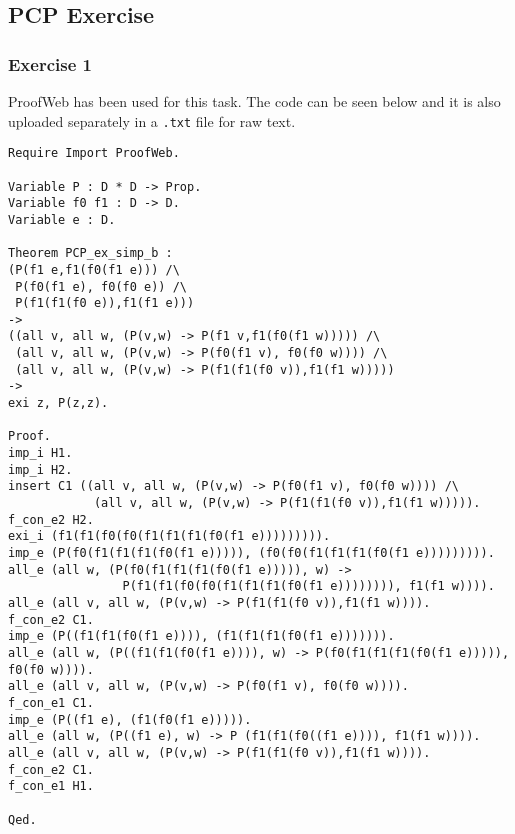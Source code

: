 \documentclass[12pt]{article}
\begin{document}
\subsection*{PCP Exercise}
\subsubsection*{Exercise 1}
ProofWeb has been used for this task. The code can be seen below and it is also uploaded separately in a \texttt{.txt} file for raw text.
\begin{Verbatim}[fontsize=\small]
Require Import ProofWeb.

Variable P : D * D -> Prop.
Variable f0 f1 : D -> D.
Variable e : D.

Theorem PCP_ex_simp_b : 
(P(f1 e,f1(f0(f1 e))) /\
 P(f0(f1 e), f0(f0 e)) /\
 P(f1(f1(f0 e)),f1(f1 e)))
->
((all v, all w, (P(v,w) -> P(f1 v,f1(f0(f1 w))))) /\
 (all v, all w, (P(v,w) -> P(f0(f1 v), f0(f0 w)))) /\
 (all v, all w, (P(v,w) -> P(f1(f1(f0 v)),f1(f1 w)))))
->
exi z, P(z,z).

Proof.
imp_i H1.
imp_i H2.
insert C1 ((all v, all w, (P(v,w) -> P(f0(f1 v), f0(f0 w)))) /\ 
            (all v, all w, (P(v,w) -> P(f1(f1(f0 v)),f1(f1 w))))).
f_con_e2 H2.
exi_i (f1(f1(f0(f0(f1(f1(f1(f0(f1 e))))))))).
imp_e (P(f0(f1(f1(f1(f0(f1 e))))), (f0(f0(f1(f1(f1(f0(f1 e))))))))).
all_e (all w, (P(f0(f1(f1(f1(f0(f1 e))))), w) -> 
                P(f1(f1(f0(f0(f1(f1(f1(f0(f1 e)))))))), f1(f1 w)))).
all_e (all v, all w, (P(v,w) -> P(f1(f1(f0 v)),f1(f1 w)))).
f_con_e2 C1.
imp_e (P((f1(f1(f0(f1 e)))), (f1(f1(f1(f0(f1 e))))))).
all_e (all w, (P((f1(f1(f0(f1 e)))), w) -> P(f0(f1(f1(f1(f0(f1 e))))), f0(f0 w)))).
all_e (all v, all w, (P(v,w) -> P(f0(f1 v), f0(f0 w)))).
f_con_e1 C1.
imp_e (P((f1 e), (f1(f0(f1 e))))).
all_e (all w, (P((f1 e), w) -> P (f1(f1(f0((f1 e)))), f1(f1 w)))).
all_e (all v, all w, (P(v,w) -> P(f1(f1(f0 v)),f1(f1 w)))).
f_con_e2 C1.
f_con_e1 H1.

Qed.
\end{Verbatim}
\end{document}
